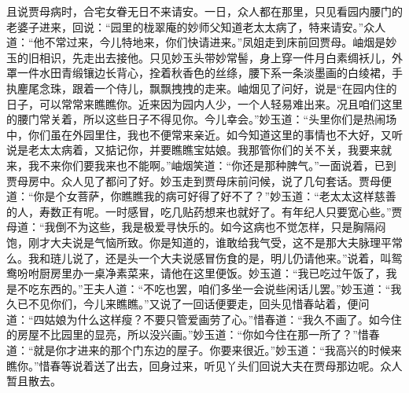 \begin{parag}
    且说贾母病时，合宅女眷无日不来请安。一日，众人都在那里，只见看园内腰门的老婆子进来，回说：“园里的栊翠庵的妙师父知道老太太病了，特来请安。”众人道：“他不常过来，今儿特地来，你们快请进来。”凤姐走到床前回贾母。岫烟是妙玉的旧相识，先走出去接他。只见妙玉头带妙常髻，身上穿一件月白素绸袄儿，外罩一件水田青缎镶边长背心，拴着秋香色的丝绦，腰下系一条淡墨画的白绫裙，手执麈尾念珠，跟着一个侍儿，飘飘拽拽的走来。岫烟见了问好，说是“在园内住的日子，可以常常来瞧瞧你。近来因为园内人少，一个人轻易难出来。况且咱们这里的腰门常关着，所以这些日子不得见你。今儿幸会。”妙玉道：“头里你们是热闹场中，你们虽在外园里住，我也不便常来亲近。如今知道这里的事情也不大好，又听说是老太太病着，又掂记你，并要瞧瞧宝姑娘。我那管你们的关不关，我要来就来，我不来你们要我来也不能啊。”岫烟笑道：“你还是那种脾气。”一面说着，已到贾母房中。众人见了都问了好。妙玉走到贾母床前问候，说了几句套话。贾母便道：“你是个女菩萨，你瞧瞧我的病可好得了好不了？”妙玉道：“老太太这样慈善的人，寿数正有呢。一时感冒，吃几贴药想来也就好了。有年纪人只要宽心些。”贾母道：“我倒不为这些，我是极爱寻快乐的。如今这病也不觉怎样，只是胸隔闷饱，刚才大夫说是气恼所致。你是知道的，谁敢给我气受，这不是那大夫脉理平常么。我和琏儿说了，还是头一个大夫说感冒伤食的是，明儿仍请他来。”说着，叫鸳鸯吩咐厨房里办一桌净素菜来，请他在这里便饭。妙玉道：“我已吃过午饭了，我是不吃东西的。”王夫人道：“不吃也罢，咱们多坐一会说些闲话儿罢。”妙玉道：“我久已不见你们，今儿来瞧瞧。”又说了一回话便要走，回头见惜春站着，便问道：“四姑娘为什么这样瘦？不要只管爱画劳了心。”惜春道：“我久不画了。如今住的房屋不比园里的显亮，所以没兴画。”妙玉道：“你如今住在那一所了？”惜春道：“就是你才进来的那个门东边的屋子。你要来很近。”妙玉道：“我高兴的时候来瞧你。”惜春等说着送了出去，回身过来，听见丫头们回说大夫在贾母那边呢。众人暂且散去。
\end{parag}


